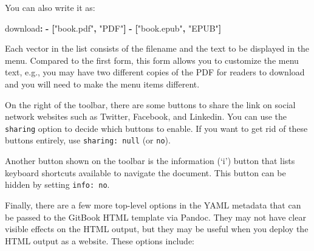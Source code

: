 \documentclass[
  12pt,
]{krantz}
\newenvironment{Shaded}{\begin{snugshade}}{\end{snugshade}}
\newcommand{\AttributeTok}[1]{\textcolor[rgb]{0.77,0.63,0.00}{#1}}
\newcommand{\FunctionTok}[1]{\textcolor[rgb]{0.00,0.00,0.00}{#1}}
\newcommand{\KeywordTok}[1]{\textcolor[rgb]{0.13,0.29,0.53}{\textbf{#1}}}
\newcommand{\StringTok}[1]{\textcolor[rgb]{0.31,0.60,0.02}{#1}}
\theoremstyle{definition}
\theoremstyle{definition}
\theoremstyle{definition}
\theoremstyle{definition}
\theoremstyle{remark}
\begin{document}
You can also write it as:

\begin{Shaded}
\begin{Highlighting}[]
\AttributeTok{    }\FunctionTok{download}\KeywordTok{:}
\AttributeTok{      }\KeywordTok{{-}}\AttributeTok{ }\KeywordTok{[}\StringTok{"book.pdf"}\KeywordTok{,}\AttributeTok{ }\StringTok{"PDF"}\KeywordTok{]}
\AttributeTok{      }\KeywordTok{{-}}\AttributeTok{ }\KeywordTok{[}\StringTok{"book.epub"}\KeywordTok{,}\AttributeTok{ }\StringTok{"EPUB"}\KeywordTok{]}
\end{Highlighting}
\end{Shaded}

Each vector in the list consists of the filename and the text to be displayed in the menu. Compared to the first form, this form allows you to customize the menu text, e.g., you may have two different copies of the PDF for readers to download and you will need to make the menu items different.

On the right of the toolbar, there are some buttons to share the link on social network websites such as Twitter, Facebook, and Linkedin. You can use the \texttt{sharing} option to decide which buttons to enable. If you want to get rid of these buttons entirely, use \texttt{sharing:\ null} (or \texttt{no}).

Another button shown on the toolbar is the information (`i') button that lists keyboard shortcuts available to navigate the document. This button can be hidden by setting \texttt{info:\ no}.

Finally, there are a few more top-level options in the YAML metadata that can be passed to the GitBook HTML template via Pandoc. They may not have clear visible effects on the HTML output, but they may be useful when you deploy the HTML output as a website. These options include:
\end{document}

